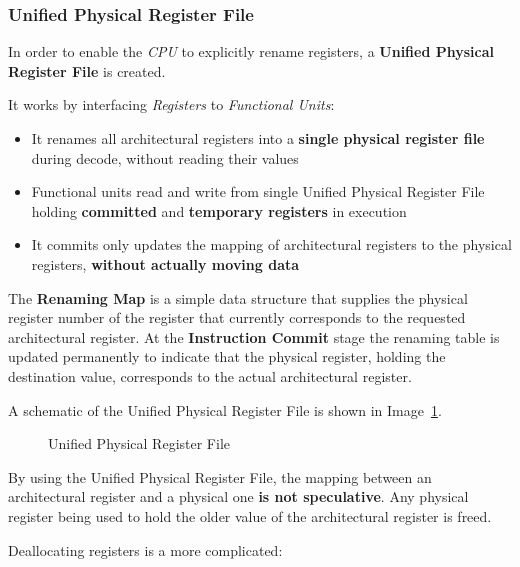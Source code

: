 \documentclass[english]{article}
\begin{document}
\subsubsection{Unified Physical Register File}

In order to enable the \textit{CPU} to explicitly rename registers, a \textbf{Unified Physical Register File} is created.

It works by interfacing \textit{Registers} to \textit{Functional Units}:

\begin{itemize}
  \item It renames all architectural registers into a \textbf{single physical register file} during decode, without reading their values
  \item Functional units read and write from single Unified Physical Register File holding \textbf{committed} and \textbf{temporary registers} in execution
  \item It commits only updates the mapping of architectural registers to the physical registers, \textbf{without actually moving data}
\end{itemize}

The \textbf{Renaming Map} is a  simple data structure that supplies the physical register number of the register that currently corresponds to the requested architectural register.
At the \textbf{Instruction Commit} stage the renaming table is updated permanently to indicate that the physical register, holding the destination value, corresponds to the actual architectural register.

A schematic of the Unified Physical Register File is shown in Image~\ref{fig:unified-physical-register-file}.

\begin{figure}[htbp]
  \bigskip
  \centering
  \caption{Unified Physical Register File}
  \label{fig:unified-physical-register-file}
  \bigskip
\end{figure}

\bigskip
By using the Unified Physical Register File, the mapping between an architectural register and a physical one \textbf{is not speculative}.
Any physical register being used to hold the older value of the architectural register is freed.

Deallocating registers is a more complicated:
\end{document}
